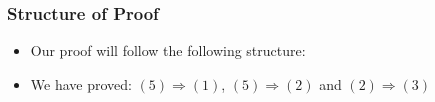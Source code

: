 \documentclass[handout]{beamer}
\begin{document}
\frame
{
  \frametitle{Structure of Proof} 

   \begin{itemize}

               \item<1-> Our proof will follow the following structure: 
                     
                    \item<2-> We have proved:   $(5)\Rightarrow (1)$,  $(5)\Rightarrow (2)$ and  $(2)\Rightarrow (3)$
                                       
                     
                     
                                               \end{itemize}
}
\end{document}
